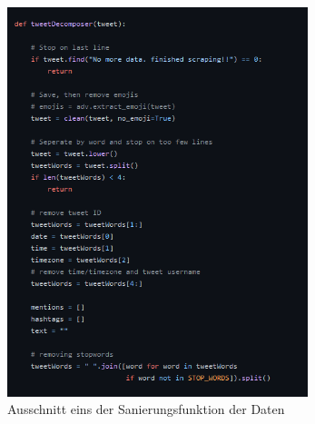 	\begin{figure}[ht]
		\centering
		\includegraphics[width=0.78\textwidth]{images/Kapitel2/Code_Datensanierung_2}
		\caption{\label{fig:DataSanF1}Ausschnitt eins der Sanierungsfunktion der Daten}{}		
	\end{figure}